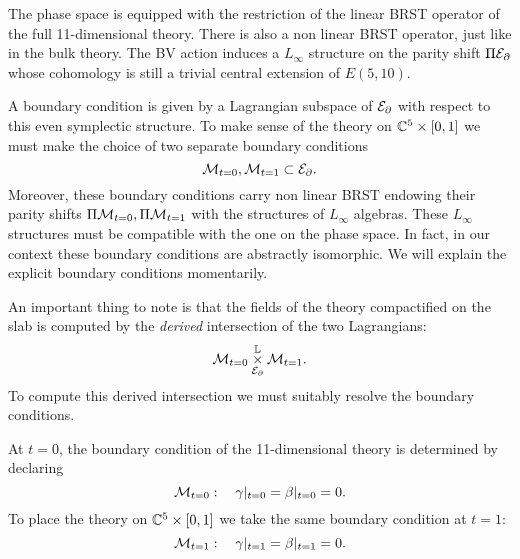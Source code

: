 The phase space is equipped with the restriction of the linear BRST operator of the full 11-dimensional theory. 
There is also a non linear BRST operator, just like in the bulk theory.
The BV action induces a $L_\infty$ structure on the parity shift $\Pi\mathcal E_{\partial}$ whose cohomology is still a trivial central extension of $E(5,10)$. 

A boundary condition is given by a Lagrangian subspace of $\mathcal E_{\partial}$ with respect to this even symplectic structure. 
To make sense of the theory on $\mathbb C^5 \times [0,1]$ we must make the choice of two separate boundary conditions 
\[
\mathcal M_{t=0} , \mathcal M_{t=1} \subset \mathcal E_{\partial} .
\]
Moreover, these boundary conditions carry non linear BRST endowing their parity shifts $\Pi \mathcal M_{t=0} , \Pi\mathcal M_{t=1}$ with the structures of $L_\infty$ algebras. 
These $L_\infty$ structures must be compatible with the one on the phase space.
In fact, in our context these boundary conditions are abstractly isomorphic. 
We will explain the explicit boundary conditions momentarily. 

An important thing to note is that the fields of the theory compactified on the slab is computed by the {\em derived} intersection of the two Lagrangians:
\[
\mathcal M_{t=0} \overset{\mathbb L}{\underset{\mathcal E_{\partial}}{\times}}\mathcal M_{t=1}.
\]
To compute this derived intersection we must suitably resolve the boundary conditions.


\parsec[s:boundary]
At $t=0$, the boundary condition of the 11-dimensional theory is determined by declaring 
\[
\mathcal M_{t=0}: \quad \gamma|_{t=0} = \beta|_{t=0} = 0 .
\]
To place the theory on $\mathbb C^5 \times [0,1]$ we take the same boundary condition at $t=1$:
\[
\mathcal M_{t=1}: \quad \gamma|_{t=1} = \beta|_{t=1} = 0 .
\]

